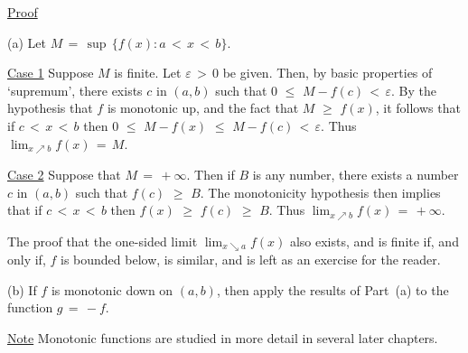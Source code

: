 {\V

        \underline{Proof}

\V

\hspace*{\parindent}(a) Let $M \,=\, {\sup}\,\{f(x): a\,<\,x\,<\,b\}$.

        \underline{Case 1} Suppose $M$ is finite. Let ${\varepsilon}\,>\,0$ be given. Then, by basic properties of `supremum',
    there exists $c$ in $(a,b)$ such that $0\,\,{\leq}\,\,M-f(c)\,<\,{\varepsilon}$.
    By the hypothesis that $f$ is monotonic up, and the fact that $M\,\,{\geq}\,\,f(x)$, 
    it follows that if $c\,<\,x\,<\,b$ then $0\,\,{\leq}\,\,M-f(x)\,\,{\leq}\,\,M-f(c)\,<\,{\varepsilon}$.
    Thus $\lim_{x{\nearrow}b} f(x) \,=\, M$.

        \underline{Case 2} Suppose that $M \,=\, +{\infty}$. Then if $B$ is any number, there exists a number $c$ in $(a,b)$ such that $f(c)\,\,{\geq}\,\,B$.
    The monotonicity hypothesis then implies that if $c\,<\,x\,<\,b$ then $f(x) \,\,{\geq}\,\,f(c)\,\,{\geq}\,\,B$.
    Thus $\lim_{x{\nearrow}b} f(x) \,=\, +{\infty}$.

        The proof that the one-sided limit $\lim_{x{\searrow}a} f(x)$ also exists, and is finite if, and only if, $f$ is bounded below, is similar, and is left as an exercise for the reader.

\V

        (b) If $f$ is monotonic down on $(a,b)$, then apply the results of Part~(a) to the function $g \,=\, -f$.

\V

        \underline{Note} Monotonic functions are studied in more detail in several later chapters.

}%

